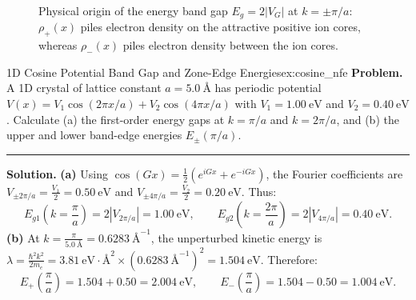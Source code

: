 \documentclass[11pt,a4paper]{article}
\newcommand{\abs}[1]{\left|#1\right|}
\newcommand{\hb}{\hbar}
\newcommand{\hbarsq}{\hb^2}
\begin{document}
\begin{figure}[htbp]
\centering
{}
\caption{Physical origin of the energy band gap $E_g = 2\abs{V_G}$ at $k = \pm\pi/a$: $\rho_+(x)$ piles electron density on the attractive positive ion cores, whereas $\rho_-(x)$ piles electron density between the ion cores.}
\label{fig:standing_waves_master}
\end{figure}

\begin{examplebox}{1D Cosine Potential Band Gap and Zone-Edge Energies}{ex:cosine_nfe}
\textbf{Problem.} A 1D crystal of lattice constant $a = 5.0\ \text{\AA}$ has periodic potential $V(x) = V_1\cos(2\pi x/a) + V_2\cos(4\pi x/a)$ with $V_1 = 1.00\ \mathrm{eV}$ and $V_2 = 0.40\ \mathrm{eV}$. Calculate (a) the first-order energy gaps at $k = \pi/a$ and $k = 2\pi/a$, and (b) the upper and lower band-edge energies $E_\pm(\pi/a)$.
\vspace{0.2cm}\hrule\vspace{0.2cm}
\textbf{Solution.}
\textbf{(a)} Using $\cos(Gx) = \frac{1}{2}(e^{iGx} + e^{-iGx})$, the Fourier coefficients are $V_{\pm 2\pi/a} = \frac{V_1}{2} = 0.50\ \mathrm{eV}$ and $V_{\pm 4\pi/a} = \frac{V_2}{2} = 0.20\ \mathrm{eV}$. Thus:
\[
    E_{g1}\left(k=\frac{\pi}{a}\right) = 2\abs{V_{2\pi/a}} = \mathbf{1.00\ \mathrm{eV}}, \qquad E_{g2}\left(k=\frac{2\pi}{a}\right) = 2\abs{V_{4\pi/a}} = \mathbf{0.40\ \mathrm{eV}}.
\]
\textbf{(b)} At $k = \frac{\pi}{5.0\ \text{\AA}} = 0.6283\ \text{\AA}^{-1}$, the unperturbed kinetic energy is $\lambda = \frac{\hbarsq k^2}{2m_e} = 3.81\ \mathrm{eV\cdot\text{\AA}^2}\times (0.6283\ \text{\AA}^{-1})^2 = 1.504\ \mathrm{eV}$. Therefore:
\[
    E_+\left(\frac{\pi}{a}\right) = 1.504 + 0.50 = \mathbf{2.004\ \mathrm{eV}}, \qquad E_-\left(\frac{\pi}{a}\right) = 1.504 - 0.50 = \mathbf{1.004\ \mathrm{eV}}.
\]
\end{examplebox}
\end{document}
